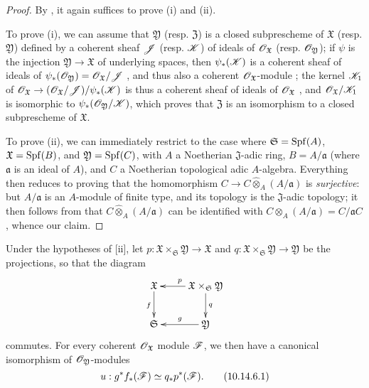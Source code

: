 \begin{proof}
By , it again suffices to prove (i) and (ii).

To prove (i), we can assume that $\mathfrak{Y}$ (resp. $\mathfrak{Z}$) is a closed subprescheme of $\mathfrak{X}$ (resp. $\mathfrak{Y}$) defined by a coherent sheaf $\mathscr{J}$ (resp. $\mathscr{K}$) of ideals of $\mathscr{O}_\mathfrak{X}$ (resp. $\mathscr{O}_\mathfrak{Y}$);
if $\psi$ is the injection $\mathfrak{Y}\to\mathfrak{X}$ of underlying spaces, then $\psi_*(\mathscr{K})$ is a coherent sheaf of ideals of $\psi_*(\mathscr{O}_\mathfrak{Y})=\mathscr{O}_\mathfrak{X}/\mathscr{J}$ , and thus also a coherent $\mathscr{O}_\mathfrak{X}$-module ;
the kernel $\mathscr{K}_1$ of $\sh{O}_\mathfrak{X}\to(\sh{O}_\mathfrak{X}/\sh{J})/\psi_*(\sh{K})$ is thus a coherent sheaf of ideals of $\mathscr{O}_\mathfrak{X}$ , and $\mathscr{O}_\mathfrak{X}/\mathscr{K}_1$ is isomorphic to $\psi_*(\mathscr{O}_\mathfrak{Y}/\mathscr{K})$, which proves that $\mathfrak{Z}$ is an isomorphism to a closed subprescheme of $\mathfrak{X}$.

To prove (ii), we can immediately restrict to the case where $\mathfrak{S}=\operatorname{Spf}(A)$, $\mathfrak{X}=\operatorname{Spf}(B)$, and $\mathfrak{Y}=\operatorname{Spf}(C)$, with $A$ a Noetherian $\mathfrak{J}$-adic ring, $B=A/\mathfrak{a}$ (where $\mathfrak{a}$ is an ideal of $A$), and $C$ a Noetherian topological adic $A$-algebra.
Everything then reduces to proving that the homomorphism $C\to C\widehat{\otimes}_A(A/\mathfrak{a})$ is \emph{surjective}:
but $A/\mathfrak{a}$ is an $A$-module of finite type, and its topology is the $\mathfrak{J}$-adic topology;
it then follows from  that $C\widehat{\otimes}_A(A/\mathfrak{a})$ can be identified with $C\otimes_A(A/\mathfrak{a})=C/\mathfrak{a}C$, whence our claim.
\end{proof}

\begin{corollary}[10.14.6]
\label{I.10.14.6}
Under the hypotheses of [ii], let $p:\mathfrak{X}\times_\mathfrak{S}\mathfrak{Y}\to\mathfrak{X}$ and $q:\mathfrak{X}\times_\mathfrak{S}\mathfrak{Y}\to\mathfrak{Y}$ be the projections, so that the diagram
\[
  \xymatrix{
    \mathfrak{X}\ar[d]_f &
    \mathfrak{X}\times_\mathfrak{S}\mathfrak{Y}\ar[l]_p\ar[d]^q\\
    \mathfrak{S} &
    \mathfrak{Y}\ar[l]_g
  }
\]
commutes.
For every coherent $\mathscr{O}_\mathfrak{X}$ module $\mathscr{F}$, we then have a canonical isomorphism of $\mathscr{O}_\mathfrak{Y}$-modules
\[
\label{I.10.14.6.1}
  u:g^*f_*(\mathscr{F})\simeq q_*p^*(\mathscr{F}).
  \tag{10.14.6.1}
\]
\end{corollary}

